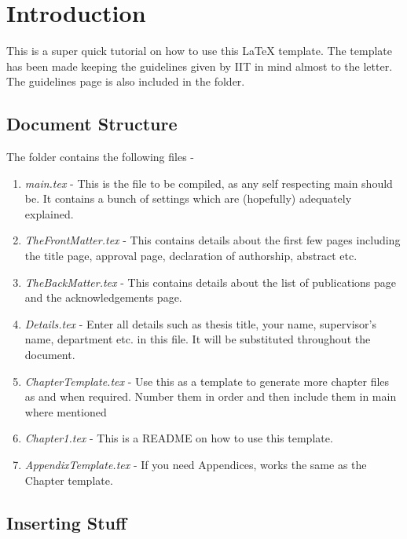 
\chapter{Introduction} 

\label{Chapter1} 


This is a super quick tutorial on how to use this \LaTeX
template. The template has been made keeping the guidelines given by IIT in mind almost to the letter. The guidelines page is also included in the folder.

\section{Document Structure}

The folder contains the following files - 
\begin{enumerate}
\item \textit{main.tex} - This is the file to be compiled, as any self respecting main should be. It contains a bunch of settings which are (hopefully) adequately explained.
\item \textit{TheFrontMatter.tex} - This contains details about the first few pages including the title page, approval page, declaration of authorship, abstract etc.
\item \textit{TheBackMatter.tex} - This contains details about the list of publications page and the acknowledgements page.
\item \textit{Details.tex} - Enter all details such as thesis title, your name, supervisor's name, department etc. in this file. It will be substituted throughout the document.
\item \textit{ChapterTemplate.tex} - Use this as a template to generate more chapter files as and when required. Number them in order and then include them in main where mentioned
\item \textit{Chapter1.tex} - This is a README on how to use this template.
\item \textit{AppendixTemplate.tex} - If you need Appendices, works the same as the Chapter template.
\end{enumerate}

\section{Inserting Stuff}

